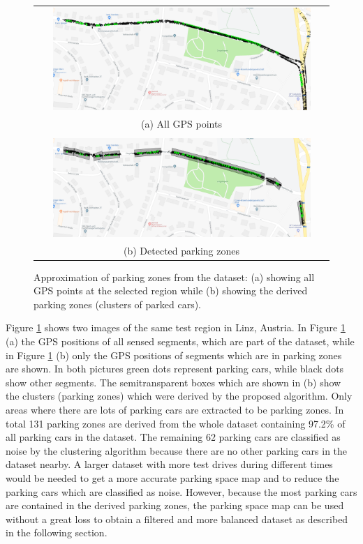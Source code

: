 \begin{figure}
\centering
\def\arraystretch{1.2}

\begin{tabular}{ c }
	\includegraphics[width=0.9\textwidth]{img/parking_space_map_all_gps_2.PNG}
	\\
	(a) All GPS points
	\\
    \\
	\includegraphics[width=0.9\textwidth]{img/parking_space_map_zones_2.PNG}
    \\
    (b) Detected parking zones
\end{tabular}

	\caption{Approximation of parking zones from the dataset: (a) showing all GPS points at the selected region while (b) showing the derived parking zones (clusters of parked cars).}
	\label{fig:parking_space_map}
\end{figure}

Figure \ref{fig:parking_space_map} shows two images of the same test region in Linz, Austria. In Figure \ref{fig:parking_space_map} (a) the GPS positions of all sensed segments, which are part of the dataset, while in Figure \ref{fig:parking_space_map} (b) only the GPS positions of segments which are in parking zones are shown. In both pictures green dots represent parking cars, while black dots show other segments. The semitransparent boxes which are shown in (b) show the clusters (parking zones) which were derived by the proposed algorithm. 
Only areas where there are lots of parking cars are extracted to be parking zones. In total 131 parking zones are derived from the whole dataset containing 97.2\% of all parking cars in the dataset. The remaining 62 parking cars are classified as noise by the clustering algorithm because there are no other parking cars in the dataset nearby. A larger dataset with more test drives during different times would be needed to get a more accurate parking space map and to reduce the parking cars which are classified as noise. However, because the most parking cars are contained in the derived parking zones, the parking space map can be used without a great loss to obtain a filtered and more balanced dataset as described in the following section.




